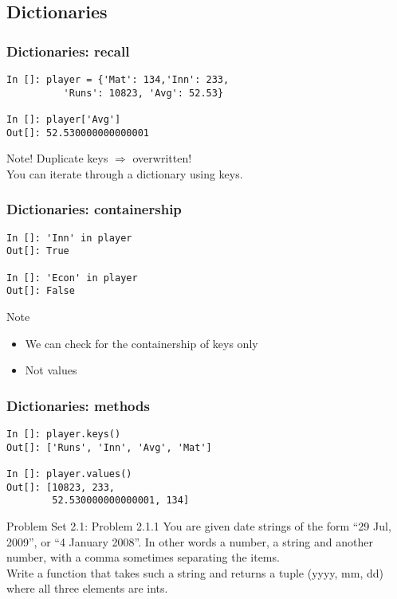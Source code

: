 \documentclass[14pt,compress]{beamer}
\newcounter{time}
\begin{document}
\subsection{Dictionaries}
\begin{frame}[fragile]
  \frametitle{Dictionaries: recall}
  \begin{lstlisting}
In []: player = {'Mat': 134,'Inn': 233,
          'Runs': 10823, 'Avg': 52.53}

In []: player['Avg']
Out[]: 52.530000000000001
  \end{lstlisting}
  \begin{block}{Note!}
    Duplicate keys $\Rightarrow$ overwritten!\\
    You can iterate through a dictionary using keys.
  \end{block}
\end{frame}

\begin{frame}[fragile]
  \frametitle{Dictionaries: containership}
  \begin{lstlisting}
In []: 'Inn' in player
Out[]: True

In []: 'Econ' in player
Out[]: False
  \end{lstlisting}
  \begin{block}{Note}
    \begin{itemize}
      \item We can check for the containership of keys only
      \item Not values
    \end{itemize}
  \end{block}
\end{frame}

\begin{frame}[fragile]
  \frametitle{Dictionaries: methods}
  \begin{lstlisting}
In []: player.keys()
Out[]: ['Runs', 'Inn', 'Avg', 'Mat']

In []: player.values()
Out[]: [10823, 233, 
        52.530000000000001, 134]
  \end{lstlisting}
\end{frame}

\begin{frame} {Problem Set 2.1: Problem 2.1.1}
You are given date strings of the form ``29 Jul, 2009'', or ``4 January 2008''. In other words a number, a string and another number, with a comma sometimes separating the items.\\Write a function that takes such a string and returns a tuple (yyyy, mm, dd) where all three elements are ints.
\end{frame}
\end{document}

